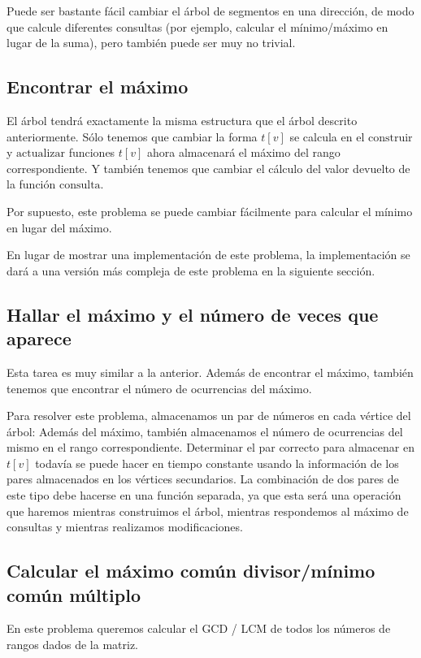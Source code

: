 Puede ser bastante fácil cambiar el árbol de segmentos en una dirección, de modo que calcule diferentes consultas (por ejemplo, calcular el mínimo/máximo en lugar de la suma), pero también puede ser muy no trivial.

\subsection{Encontrar el máximo}

El árbol tendrá exactamente la misma estructura que el árbol descrito anteriormente. Sólo tenemos que cambiar la forma $t[v]$ se calcula en el $\text{construir}$ y $\text{actualizar}$ funciones $t[v]$ ahora almacenará el máximo del rango correspondiente. Y también tenemos que cambiar el cálculo del valor devuelto de la función $\text{consulta}$.

Por supuesto, este problema se puede cambiar fácilmente para calcular el mínimo en lugar del máximo.

En lugar de mostrar una implementación de este problema, la implementación se dará a una versión más compleja de este problema en la siguiente sección.

\subsection{Hallar el máximo y el número de veces que aparece}

Esta tarea es muy similar a la anterior. Además de encontrar el máximo, también tenemos que encontrar el número de ocurrencias del máximo.

Para resolver este problema, almacenamos un par de números en cada vértice del árbol: Además del máximo, también almacenamos el número de ocurrencias del mismo en el rango correspondiente. Determinar el par correcto para almacenar en $t[v]$ todavía se puede hacer en tiempo constante usando la información de los pares almacenados en los vértices secundarios. La combinación de dos pares de este tipo debe hacerse en una función separada, ya que esta será una operación que haremos mientras construimos el árbol, mientras respondemos al máximo de consultas y mientras realizamos modificaciones.

\subsection{Calcular el máximo común divisor/mínimo común múltiplo}

En este problema queremos calcular el GCD / LCM de todos los números de rangos dados de la matriz.

